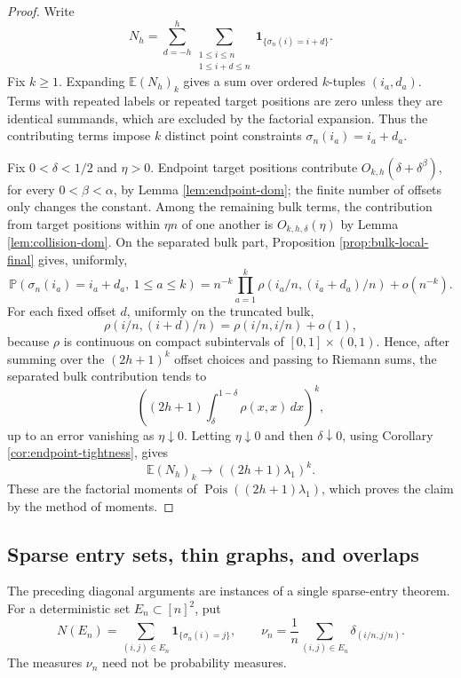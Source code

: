 \documentclass[11pt]{article}
\theoremstyle{remark}
\newcommand{\Pp}{\mathbb P}
\newcommand{\Ee}{\mathbb E}
\newcommand{\one}{\mathbf 1}
\newcommand{\Pois}{\operatorname{Pois}}
\newcommand{\dd}{\,d}
\begin{document}
\begin{proof}
Write
\[
        N_h=\sum_{d=-h}^h\sum_{\substack{1\le i\le n\\1\le i+d\le n}}
        \one_{\{\sigma_n(i)=i+d\}} .
\]
Fix \(k\ge1\).  Expanding \(\Ee(N_h)_k\) gives a sum over ordered \(k\)-tuples
\((i_a,d_a)\).  Terms with repeated labels or repeated target positions are
zero unless they are identical summands, which are excluded by the factorial
expansion.  Thus the contributing terms impose \(k\) distinct point constraints
\(\sigma_n(i_a)=i_a+d_a\).

Fix \(0<\delta<1/2\) and \(\eta>0\).  Endpoint target positions contribute
\(O_{k,h}(\delta+\delta^\beta)\), for every \(0<\beta<\alpha\), by Lemma
\ref{lem:endpoint-dom}; the finite number of offsets only changes the constant.
Among the remaining bulk terms, the contribution from target positions within
\(\eta n\) of one another is \(O_{k,h,\delta}(\eta)\) by Lemma
\ref{lem:collision-dom}.  On the separated bulk part, Proposition
\ref{prop:bulk-local-final} gives, uniformly,
\[
        \Pp(\sigma_n(i_a)=i_a+d_a,\ 1\le a\le k)
        =n^{-k}\prod_{a=1}^k
        \rho(i_a/n,(i_a+d_a)/n)+o(n^{-k}).
\]
For each fixed offset \(d\), uniformly on the truncated bulk,
\[
        \rho(i/n,(i+d)/n)=\rho(i/n,i/n)+o(1),
\]
because \(\rho\) is continuous on compact subintervals of
\([0,1]\times(0,1)\).  Hence, after summing over the \((2h+1)^k\) offset
choices and passing to Riemann sums, the separated bulk contribution tends to
\[
        \left((2h+1)\int_\delta^{1-\delta}\rho(x,x)\dd x\right)^k,
\]
up to an error vanishing as \(\eta\downarrow0\).  Letting
\(\eta\downarrow0\) and then \(\delta\downarrow0\), using Corollary
\ref{cor:endpoint-tightness}, gives
\[
        \Ee(N_h)_k\to ((2h+1)\lambda_1)^k .
\]
These are the factorial moments of \(\Pois((2h+1)\lambda_1)\), which proves the
claim by the method of moments.
\end{proof}

\subsection{Sparse entry sets, thin graphs, and overlaps}\label{subsec:sparse-entry}

The preceding diagonal arguments are instances of a single sparse-entry theorem.
For a deterministic set $E_n\subset[n]^2$, put
\[
        N(E_n)=\sum_{(i,j)\in E_n}\one_{\{\sigma_n(i)=j\}},
        \qquad
        \nu_n=\frac1n\sum_{(i,j)\in E_n}
        \delta_{(i/n,j/n)}.
\]
The measures $\nu_n$ need not be probability measures.
\end{document}
